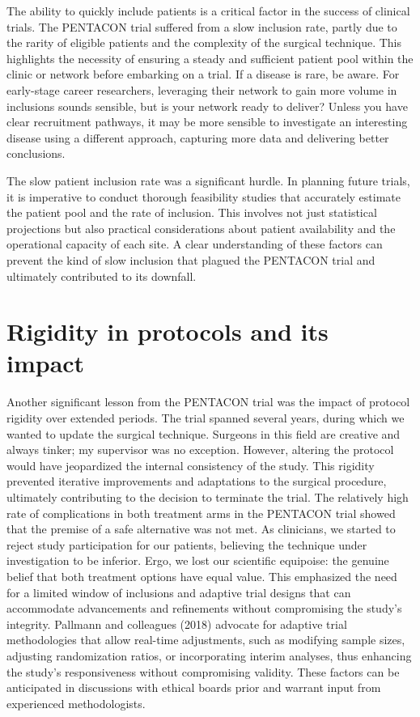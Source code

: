 \documentclass[authordate, reflection]{jote-new-article}
\begin{document}
	The ability to quickly include patients is a critical factor in the success of clinical trials. The PENTACON trial suffered from a slow inclusion rate, partly due to the rarity of eligible patients and the complexity of the surgical technique. This highlights the necessity of ensuring a steady and sufficient patient pool within the clinic or network before embarking on a trial. If a disease is rare, be aware. For early-stage career researchers, leveraging their network to gain more volume in inclusions sounds sensible, but is your network ready to deliver? Unless you have clear recruitment pathways, it may be more sensible to investigate an interesting disease using a different approach, capturing more data and delivering better conclusions.



	The slow patient inclusion rate was a significant hurdle. In planning future trials, it is imperative to conduct thorough feasibility studies that accurately estimate the patient pool and the rate of inclusion. This involves not just statistical projections but also practical considerations about patient availability and the operational capacity of each site. A clear understanding of these factors can prevent the kind of slow inclusion that plagued the PENTACON trial and ultimately contributed to its downfall.



	\section{Rigidity in protocols and its impact}



	Another significant lesson from the PENTACON trial was the impact of protocol rigidity over extended periods. The trial spanned several years, during which we wanted to update the surgical technique. Surgeons in this field are creative and always tinker; my supervisor was no exception. However, altering the protocol would have jeopardized the internal consistency of the study. This rigidity prevented iterative improvements and adaptations to the surgical procedure, ultimately contributing to the decision to terminate the trial. The relatively high rate of complications in both treatment arms in the PENTACON trial showed that the premise of a safe alternative was not met. As clinicians, we started to reject study participation for our patients, believing the technique under investigation to be inferior. Ergo, we lost our scientific equipoise: the genuine belief that both treatment options have equal value. This emphasized the need for a limited window of inclusions and adaptive trial designs that can accommodate advancements and refinements without compromising the study's integrity. Pallmann and colleagues (2018) advocate for adaptive trial methodologies that allow real-time adjustments, such as modifying sample sizes, adjusting randomization ratios, or incorporating interim analyses, thus enhancing the study's responsiveness without compromising validity. These factors can be anticipated in discussions with ethical boards prior and warrant input from experienced methodologists.
\end{document}
